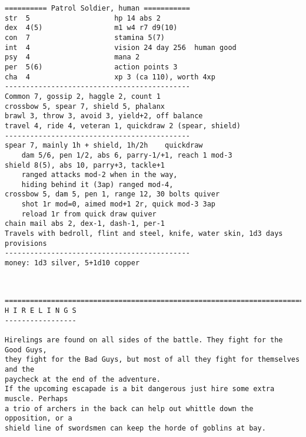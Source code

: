 \goodbreak \begin{samepage} \small \begin{verbatim}
========== Patrol Soldier, human ===========
str  5                    hp 14 abs 2
dex  4(5)                 m1 w4 r7 d9(10)
con  7                    stamina 5(7)
int  4                    vision 24 day 256  human good
psy  4                    mana 2
per  5(6)                 action points 3
cha  4                    xp 3 (ca 110), worth 4xp
--------------------------------------------
Common 7, gossip 2, haggle 2, count 1
crossbow 5, spear 7, shield 5, phalanx
brawl 3, throw 3, avoid 3, yield+2, off balance
travel 4, ride 4, veteran 1, quickdraw 2 (spear, shield)
--------------------------------------------
spear 7, mainly 1h + shield, 1h/2h    quickdraw
    dam 5/6, pen 1/2, abs 6, parry-1/+1, reach 1 mod-3
shield 8(5), abs 10, parry+3, tackle+1
    ranged attacks mod-2 when in the way,
    hiding behind it (3ap) ranged mod-4,
crossbow 5, dam 5, pen 1, range 12, 30 bolts quiver
    shot 1r mod=0, aimed mod+1 2r, quick mod-3 3ap
    reload 1r from quick draw quiver
chain mail abs 2, dex-1, dash-1, per-1
Travels with bedroll, flint and steel, knife, water skin, 1d3 days provisions
--------------------------------------------
money: 1d3 silver, 5+1d10 copper
\end{verbatim} \normalsize \end{samepage}

\











\clearpage
{}






\goodbreak \begin{samepage} \small \begin{verbatim}
================================================================================
H I R E L I N G S
-----------------

Hirelings are found on all sides of the battle. They fight for the Good Guys,
they fight for the Bad Guys, but most of all they fight for themselves and the
paycheck at the end of the adventure.
If the upcoming escapade is a bit dangerous just hire some extra muscle. Perhaps
a trio of archers in the back can help out whittle down the opposition, or a
shield line of swordsmen can keep the horde of goblins at bay.
\end{verbatim} \normalsize \end{samepage}

